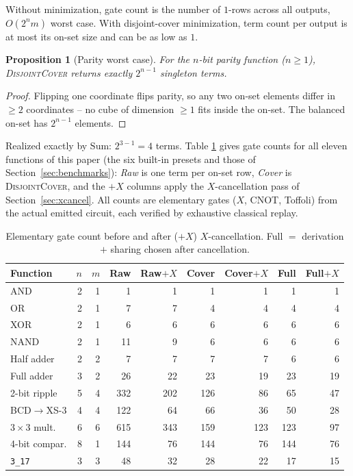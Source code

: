 \documentclass[conference]{IEEEtran}
\newcommand{\Algo}[1]{\textup{\textsc{#1}}}
\theoremstyle{plain}
\newtheorem{proposition}{Proposition}
\begin{document}
Without minimization, gate count is the number of $1$-rows across all
outputs, $O(2^n m)$ worst case. With disjoint-cover minimization, term
count per output is at most its on-set size and can be as low as $1$.

\begin{proposition}[Parity worst case]
\label{prop:parity}
For the $n$-bit parity function ($n{\ge}1$), \Algo{DisjointCover} returns
exactly $2^{n-1}$ singleton terms.
\end{proposition}
\begin{proof}
Flipping one coordinate flips parity, so any two on-set elements differ in
$\ge 2$ coordinates -- no cube of dimension $\ge 1$ fits inside the
on-set. The balanced on-set has $2^{n-1}$ elements.
\end{proof}
Realized exactly by $\mathrm{Sum}$: $2^{3-1}{=}4$ terms. Table
\ref{tab:counts} gives gate counts for all eleven functions of this paper
(the six built-in presets and those of Section~\ref{sec:benchmarks}): \emph{Raw}
is one term per on-set row, \emph{Cover} is \Algo{DisjointCover}, and the
$+X$ columns apply the $X$-cancellation pass of
Section~\ref{sec:xcancel}. All counts are elementary gates ($X$, CNOT,
Toffoli) from the actual emitted circuit, each verified by exhaustive
classical replay.

\begin{table}[t]
\centering
\caption{Elementary gate count before and after ($+X$) $X$-cancellation.
Full $=$ derivation $+$ sharing chosen after cancellation.}
\label{tab:counts}
\footnotesize
\setlength{\tabcolsep}{3.5pt}
\begin{tabular}{@{}lrrrrrrrr@{}}
\toprule
Function & $n$ & $m$ & Raw & Raw$+X$ & Cover & Cover$+X$ & Full & Full$+X$\\
\midrule
AND & 2 & 1 & 1 & 1 & 1 & 1 & 1 & 1\\
OR & 2 & 1 & 7 & 7 & 4 & 4 & 4 & 4\\
XOR & 2 & 1 & 6 & 6 & 6 & 6 & 6 & 6\\
NAND & 2 & 1 & 11 & 9 & 6 & 6 & 6 & 6\\
Half adder & 2 & 2 & 7 & 7 & 7 & 7 & 6 & 6\\
Full adder & 3 & 2 & 26 & 22 & 23 & 19 & 23 & 19\\
2-bit ripple & 5 & 4 & 332 & 202 & 126 & 86 & 65 & 47\\
BCD$\to$XS-3 & 4 & 4 & 122 & 64 & 66 & 36 & 50 & 28\\
$3{\times}3$ mult. & 6 & 6 & 615 & 343 & 159 & 123 & 123 & 97\\
4-bit compar. & 8 & 1 & 144 & 76 & 144 & 76 & 144 & 76\\
\texttt{3\_17} & 3 & 3 & 48 & 32 & 28 & 22 & 17 & 15\\
\bottomrule
\end{tabular}
\end{table}
\end{document}
